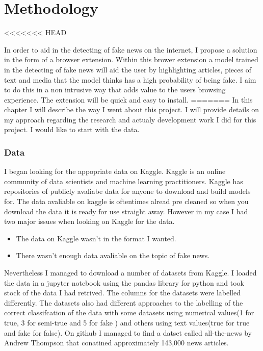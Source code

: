 \chapter{Methodology}
<<<<<<< HEAD

In order to aid in the detecting of fake news on the internet, I propose a solution in the form of a browser extension. Within this brower extension a model trained in the detecting of fake news 
will aid the user by highlighting articles, pieces of text and media that the model thinks has a high probability of being fake. I aim to do this in a non intrusive way that adds value to the users
browsing experience. The extension will be quick and easy to install.
=======
In this chapter I will describe the way I went about this project. I will provide details on my approach regarding the research and actualy development work I did for this project. I would like to start with the data.

\subsection{Data}
I began looking for the appopriate data on Kaggle. Kaggle is an online community of data scientists and machine learning practitioners. Kaggle has repositories of publicly avaliabe data for anyone to download and build models for. The data avaliable on kaggle is oftentimes alread pre cleaned so when you download the data it is ready for use straight away. However in my case I had two major issues when looking on Kaggle for the data.

\begin{itemize}
	\item The data on Kaggle wasn't in the format I wanted.
	\item There wasn't enough data avaliable on the topic of fake news.
\end{itemize}

Nevertheless I managed to download a number of datasets from Kaggle. I loaded the data in a jupyter notebook using the pandas library for python and took stock of the data I had retrived. The columns for the datasets were labelled differently. The datasets also had different approaches to the labelling of the correct classifcation of the data with some datasets using numerical values(1 for true, 3 for semi-true and 5 for fake ) and others using text values(true for true and fake for false). On github I managed to find a datset called all-the-news by Andrew Thompson that conatined approximately 143,000 news articles.


